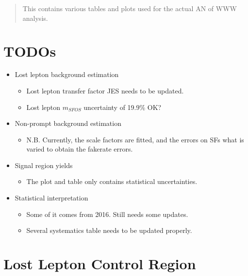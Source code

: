 \documentclass[12pt]{article}
\begin{document}
\maketitle

\begin{abstract}
This contains various tables and plots used for the actual AN of WWW analysis.
\end{abstract}

\section{TODOs}

\begin{itemize}
    \item Lost lepton background estimation
        \begin{itemize}
            \item Lost lepton transfer factor JES needs to be updated.
            \item Lost lepton $m_{SFOS}$ uncertainty of 19.9\% OK?
        \end{itemize}
    \item Non-prompt background estimation
        \begin{itemize}
            \item N.B. Currently, the scale factors are fitted, and the errors on SFs what is varied to obtain the fakerate errors.
        \end{itemize}
    \item Signal region yields
        \begin{itemize}
            \item The plot and table only contains statistical uncertainties.
        \end{itemize}
    \item Statistical interpretation
        \begin{itemize}
            \item Some of it comes from 2016. Still needs some updates.
            \item Several systematics table needs to be updated properly.
        \end{itemize}
\end{itemize}


\section{Lost Lepton Control Region}
\end{document}
